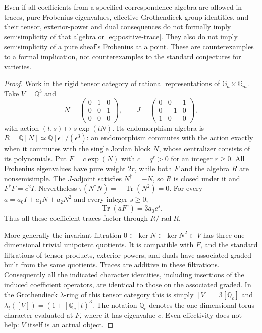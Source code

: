 \begin{theorem}
Even if all coefficients from a specified correspondence algebra are
allowed in traces, pure Frobenius eigenvalues, effective Grothendieck-group
identities, and their tensor, exterior-power and dual consequences do not
formally imply semisimplicity of that algebra or
\eqref{eq:positive-trace}.  They also do not imply semisimplicity of a
pure sheaf's Frobenius at a point.  These are counterexamples to a formal
implication, not counterexamples to the standard conjectures for varieties.
\end{theorem}
\begin{proof}
Work in the rigid tensor category of rational representations of
$\mathbb G_a\times\mathbb G_m$.  Take $V=\mathbb Q^3$ and
\[
 N=\begin{pmatrix}0&1&0\\0&0&1\\0&0&0\end{pmatrix},\qquad
 J=\begin{pmatrix}0&0&1\\0&-1&0\\1&0&0\end{pmatrix},
\]
with action $(t,s)\mapsto s\exp(tN)$.  Its endomorphism algebra is
$R=\mathbb Q[N]\simeq\mathbb Q[\epsilon]/(\epsilon^3)$:
an endomorphism commutes with the action exactly when it commutes with
the single Jordan block $N$, whose centralizer consists of its
polynomials.  Put $F=c\exp(N)$ with $c=q^r>0$ for an integer $r\geq0$.
All Frobenius eigenvalues have pure weight $2r$, while both $F$ and
the algebra $R$ are nonsemisimple.  The $J$-adjoint satisfies
$N^\dagger=-N$, so $R$ is closed under it and $F^\dagger F=c^2I$.
Nevertheless $\tau(N^\dagger N)=-\operatorname{Tr}(N^2)=0$.
For every $a=a_0I+a_1N+a_2N^2$ and every integer $s\geq0$,
\[
 \operatorname{Tr}(aF^s)=3a_0c^s.
\]
Thus all these coefficient traces factor through $R/\operatorname{rad}R$.

More generally the invariant filtration
$0\subset\ker N\subset\ker N^2\subset V$
has three one-dimensional trivial unipotent quotients.  It is compatible with
$F$, and the standard filtrations of tensor products, exterior powers,
and duals have associated graded built from the same quotients.  Traces
are additive in these filtrations.  Consequently all the indicated
character identities, including insertions of the induced coefficient
operators, are identical to those on the associated graded.
In the Grothendieck $\lambda$-ring of this tensor category this is simply
$[V]=3[\mathbb Q_c]$ and
$\lambda_t([V])=(1+[\mathbb Q_c]t)^3$.
The notation $\mathbb Q_c$ denotes the one-dimensional torus character
evaluated at $F$, where it has eigenvalue $c$.
Even effectivity does not help: $V$ itself is an actual object.


\end{proof}

